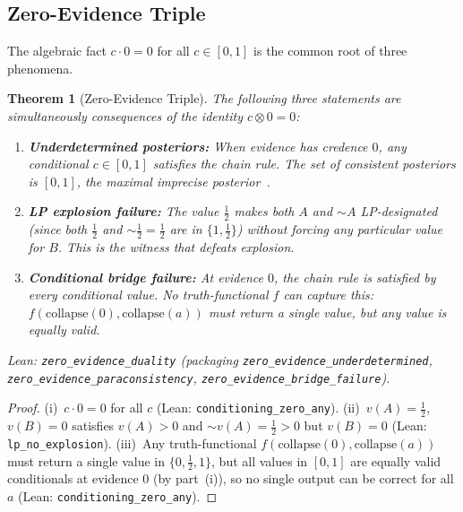 \documentclass[11pt,a4paper]{article}
\newtheorem{theorem}{Theorem}[section]
\newcommand{\negc}{\mathord{\sim}}
\newcommand{\conjc}{\otimes}
\begin{document}
\subsection{Zero-Evidence Triple}
\label{sec:zero-trichotomy}

The algebraic fact $c \cdot 0 = 0$ for all $c \in [0,1]$ is the
common root of three phenomena.

\begin{theorem}[Zero-Evidence Triple]
\label{thm:zero-trichotomy}
The following three statements are simultaneously consequences of
the identity $c \conjc 0 = 0$:
\begin{enumerate}[label=\textup{(\roman*)},nosep]
\item \textbf{Underdetermined posteriors:}
  When evidence has credence $0$, any conditional
  $c \in [0,1]$ satisfies the chain rule.
  The set of consistent posteriors is $[0,1]$, the maximal
  imprecise posterior~\cite{walley1991,levi1980}.
\item \textbf{LP explosion failure:}
  The value $\tfrac{1}{2}$ makes both $A$ and $\negc A$
  LP-designated (since both $\tfrac{1}{2}$ and $\negc\tfrac{1}{2}
  = \tfrac{1}{2}$ are in $\{1, \tfrac{1}{2}\}$) without forcing
  any particular value for $B$.
  This is the witness that defeats explosion.
\item \textbf{Conditional bridge failure:}
  At evidence $0$, the chain rule is satisfied by every conditional
  value.
  No truth-functional $f$ can capture this:
  $f(\mathrm{collapse}(0), \mathrm{collapse}(a))$ must return a
  single value, but any value is equally valid.
\end{enumerate}

\smallskip\noindent
Lean: \texttt{zero\_evidence\_duality}
(packaging \texttt{zero\_evidence\allowbreak\_underdetermined},
\texttt{zero\_evidence\allowbreak\_paraconsistency},
\texttt{zero\_evidence\allowbreak\_bridge\_failure}).
\end{theorem}

\begin{proof}
(i)~$c \cdot 0 = 0$ for all $c$
(Lean: \texttt{conditioning\_zero\_any}).
(ii)~$v(A) = \tfrac{1}{2}$, $v(B) = 0$ satisfies
$v(A) > 0$ and $\negc v(A) = \tfrac{1}{2} > 0$ but $v(B) = 0$
(Lean: \texttt{lp\_no\_explosion}).
(iii)~Any truth-functional
$f(\mathrm{collapse}(0), \mathrm{collapse}(a))$ must return a
single value in $\{0, \tfrac{1}{2}, 1\}$, but all values in $[0,1]$
are equally valid conditionals at evidence $0$ (by part~(i)), so no
single output can be correct for all $a$
(Lean: \texttt{conditioning\_zero\_any}).
\end{proof}
\end{document}
